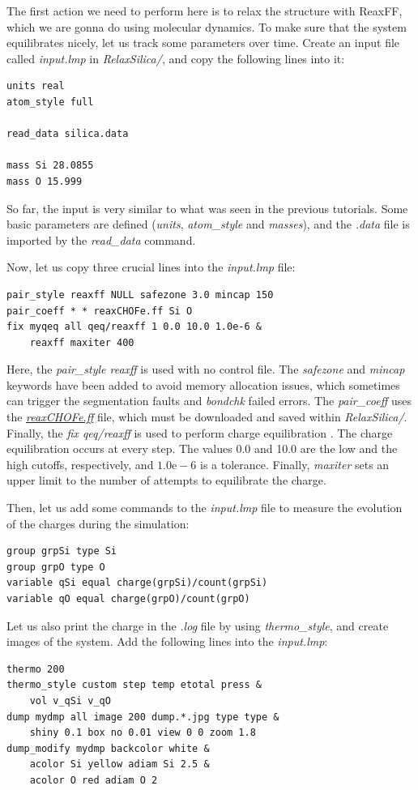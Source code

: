 \documentclass[9pt,tutorial]{livecoms}
\begin{document}
The first action we need to perform here is to relax the structure with ReaxFF,
which we are gonna do using molecular dynamics. To make sure that the system
equilibrates nicely, let us track some parameters over time. Create an input
file called \textit{input.lmp} in \textit{RelaxSilica/}, and copy the following
lines into it:
{\normalsize \begin{verbatim}
units real
atom_style full

read_data silica.data

mass Si 28.0855
mass O 15.999
\end{verbatim}}
So far, the input is very similar to what was seen in the previous tutorials.
Some basic parameters are defined (\textit{units}, \textit{atom\_style} and \textit{masses}),
and the \textit{.data} file is imported by the \textit{read\_data} command.

Now, let us copy three crucial lines into the \textit{input.lmp} file:
{\normalsize \begin{verbatim}
pair_style reaxff NULL safezone 3.0 mincap 150
pair_coeff * * reaxCHOFe.ff Si O
fix myqeq all qeq/reaxff 1 0.0 10.0 1.0e-6 &
    reaxff maxiter 400
\end{verbatim}}
Here, the \textit{pair\_style reaxff} is used with no control file. The
\textit{safezone} and \textit{mincap} keywords have been added to avoid memory
allocation issues, which sometimes can trigger the segmentation faults and
\textit{bondchk} failed errors. The \textit{pair\_coeff} uses the
\href{https://raw.githubusercontent.com/lammpstutorials/lammpstutorials-article/main/files/tutorial5/reaxCHOFe.ff}{\textit{reaxCHOFe.ff}}
file, which must be downloaded and saved within \textit{RelaxSilica/}. Finally, the
\textit{fix qeq/reaxff} is used to perform charge equilibration \cite{rappe1991charge}.
The charge equilibration occurs at every step. The values 0.0 and 10.0 are the
low and the high cutoffs, respectively, and $1.0 \text{e} -6$ is a tolerance.
Finally, \textit{maxiter} sets an upper limit to the number of attempts to
equilibrate the charge.

Then, let us add some commands to the \textit{input.lmp} file  to measure the
evolution of the charges during the simulation:
{\normalsize \begin{verbatim}
group grpSi type Si
group grpO type O
variable qSi equal charge(grpSi)/count(grpSi)
variable qO equal charge(grpO)/count(grpO)
\end{verbatim}}
Let us also print the charge in the \textit{.log} file by using \textit{thermo\_style},
and create images of the system. Add the following lines into the \textit{input.lmp}:
{\normalsize \begin{verbatim}
thermo 200
thermo_style custom step temp etotal press &
    vol v_qSi v_qO
dump mydmp all image 200 dump.*.jpg type type &
    shiny 0.1 box no 0.01 view 0 0 zoom 1.8
dump_modify mydmp backcolor white &
    acolor Si yellow adiam Si 2.5 &
    acolor O red adiam O 2
\end{verbatim}}
\end{document}
